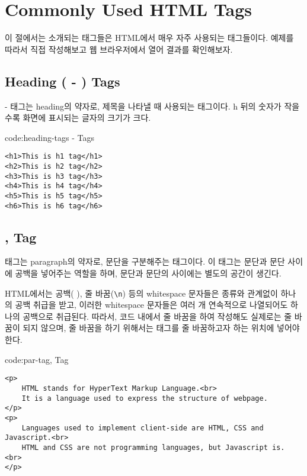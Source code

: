 \section{Commonly Used HTML Tags} \label{sect:commonly-used-html-tags}

이 절에서는 소개되는 태그들은 HTML에서 매우 자주 사용되는 태그들이다. 예제를 따라서 직접 작성해보고 웹 브라우저에서 열어 결과를 확인해보자.

\subsection*{Heading ( - ) Tags}
 -  태그는 heading의 약자로, 제목을 나타낼 때 사용되는 태그이다. h 뒤의 숫자가 작을수록 화면에 표시되는 글자의 크기가 크다.

\begin{codeenv}{code:heading-tags}{ -  Tags}\begin{verbatim}
<h1>This is h1 tag</h1>
<h2>This is h2 tag</h2>
<h3>This is h3 tag</h3>
<h4>This is h4 tag</h4>
<h5>This is h5 tag</h5>
<h6>This is h6 tag</h6>
\end{verbatim}
\end{codeenv}

\subsection*{,  Tag}
 태그는 paragraph의 약자로, 문단을 구분해주는 태그이다. 이 태그는 문단과 문단 사이에 공백을 넣어주는 역할을 하며, 문단과 문단의 사이에는 별도의 공간이 생긴다.

HTML에서는 공백( ), 줄 바꿈(\verb|\n|) 등의 whitespace 문자들은 종류와 관계없이 하나의 공백 취급을 받고, 이러한 whitespace 문자들은 여러 개 연속적으로 나열되어도 하나의 공백으로 취급된다. 따라서, 코드 내에서 줄 바꿈을 하여 작성해도 실제로는 줄 바꿈이 되지 않으며, 줄 바꿈을 하기 위해서는  태그를 줄 바꿈하고자 하는 위치에 넣어야 한다.

\begin{codeenv}{code:par-tag}{,  Tag}\begin{verbatim}
<p>
    HTML stands for HyperText Markup Language.<br>
    It is a language used to express the structure of webpage.
</p>
<p>
    Languages used to implement client-side are HTML, CSS and Javascript.<br>
    HTML and CSS are not programming languages, but Javascript is. <br>
</p>
\end{verbatim}
\end{codeenv}

